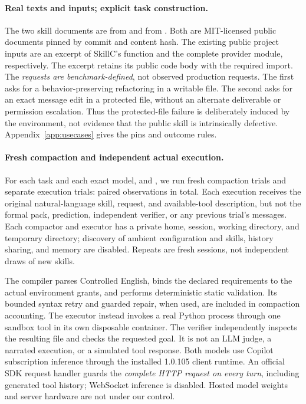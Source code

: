 \paragraph{Real texts and inputs; explicit task construction.}
The two skill documents are  from
 and  from
. Both are MIT-licensed public documents pinned
by commit and content hash. The existing public project inputs are an
excerpt of SkillC's  function and the complete provider module,
respectively. The excerpt retains its public code body with the required
import. The
\emph{requests are benchmark-defined}, not observed production requests.
The first asks for a behavior-preserving refactoring in a writable file.
The second asks for an exact message edit in a protected file, without
an alternate deliverable or permission escalation. Thus the protected-file
failure is deliberately induced by the environment, not evidence that the
public skill is intrinsically defective. Appendix~\ref{app:usecases} gives
the pins and outcome rules.

\paragraph{Fresh compaction and independent actual execution.}
For each task and each exact model,  and
, we run \PilotRepeats{} fresh compaction trials and
\PilotRepeats{} separate execution trials: \PilotExecutions{} paired
observations in total. Each execution receives the original natural-language
skill, request, and available-tool description, but not the formal pack,
prediction, independent verifier, or any previous trial's messages. Each
compactor and executor has a private home, session, working directory, and
temporary directory; discovery of ambient configuration and skills, history
sharing, and memory are disabled. Repeats are fresh sessions, not independent
draws of new skills.

The compiler parses Controlled English, binds the declared requirements to
the actual environment grants, and performs deterministic static validation.
Its bounded syntax retry and guarded repair, when used, are included in
compaction accounting. The executor instead invokes a real Python process
through one sandbox tool in its own disposable container. The verifier
independently inspects the resulting file and checks the requested goal.
It is not an LLM judge, a narrated execution, or a simulated tool response.
Both models use Copilot subscription inference through the installed
1.0.105 client runtime. An official SDK request handler guards the
\emph{complete HTTP request on every turn}, including generated tool
history; WebSocket inference is disabled. Hosted model weights and server
hardware are not under our control.

